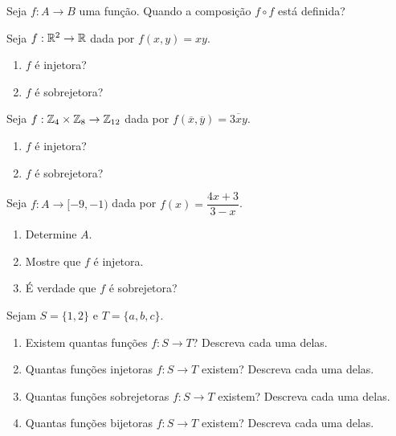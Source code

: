 \documentclass[12pt]{exam}
\begin{document}
    \newpage

    \questao{} Seja $f : A \to B$ uma função. Quando a composição $f \circ f$ está definida?

    \vspace{.3cm}

    \questao{} Seja $f: \mathbb{R}^2 \to \mathbb{R}$ dada por $f(x,y) = xy$.
    \begin{enumerate}[label={\alph*})]
        \item $f$ {\'e} injetora?

        \item $f$ {\'e} sobrejetora?
    \end{enumerate}

    \vspace{.3cm}

    \questao{} Seja $f: \mathbb{Z}_4 \times \mathbb{Z}_8 \to \mathbb{Z}_{12}$ dada por $f(\overline{x},\overline{y}) = \overline{3xy}$.
    \begin{enumerate}[label={\alph*})]
        \item $f$ {\'e} injetora?

        \item $f$ {\'e} sobrejetora?
    \end{enumerate}

    \vspace{.3cm}


    \questao{} Seja $f : A \to [-9,-1)$ dada por $f(x) = \dfrac{4x + 3}{3 - x}$.
    \begin{enumerate}[label={\alph*})]
        \item Determine $A$.

        \item Mostre que $f$ \'e injetora.

        \item \'E verdade que $f$ \'e sobrejetora?
    \end{enumerate}

    \vspace{.3cm}

    \questao{} Sejam $S = \{1,2\}$ e $T = \{a, b, c\}$.
    \begin{enumerate}[label={\alph*})]
        \item Existem quantas funções $f : S \to T$? Descreva cada uma delas.

        \item Quantas funções injetoras $f : S \to T$ existem? Descreva cada uma delas.

        \item Quantas funções sobrejetoras $f : S \to T$ existem? Descreva cada uma delas.

        \item Quantas funções bijetoras $f : S \to T$ existem? Descreva cada uma delas.
    \end{enumerate}
\end{document}
